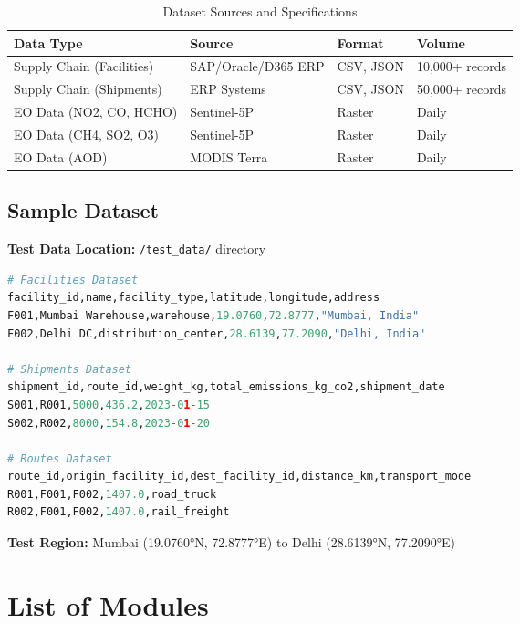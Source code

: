 \documentclass[11pt,a4paper]{article}
\begin{document}
\begin{table}[H]
\centering
\begin{tabular}{|l|l|l|l|}
\hline
\textbf{Data Type} & \textbf{Source} & \textbf{Format} & \textbf{Volume} \\
\hline
Supply Chain (Facilities) & SAP/Oracle/D365 ERP & CSV, JSON & 10,000+ records \\
Supply Chain (Shipments) & ERP Systems & CSV, JSON & 50,000+ records \\
EO Data (NO2, CO, HCHO) & Sentinel-5P & Raster & Daily \\
EO Data (CH4, SO2, O3) & Sentinel-5P & Raster & Daily \\
EO Data (AOD) & MODIS Terra & Raster & Daily \\
\hline
\end{tabular}
\caption{Dataset Sources and Specifications}
\end{table}

\subsection{Sample Dataset}

\textbf{Test Data Location:} \texttt{/test\_data/} directory

\begin{lstlisting}[language=Python, caption=Sample Data Structure, basicstyle=\footnotesize]
# Facilities Dataset
facility_id,name,facility_type,latitude,longitude,address
F001,Mumbai Warehouse,warehouse,19.0760,72.8777,"Mumbai, India"
F002,Delhi DC,distribution_center,28.6139,77.2090,"Delhi, India"

# Shipments Dataset
shipment_id,route_id,weight_kg,total_emissions_kg_co2,shipment_date
S001,R001,5000,436.2,2023-01-15
S002,R002,8000,154.8,2023-01-20

# Routes Dataset
route_id,origin_facility_id,dest_facility_id,distance_km,transport_mode
R001,F001,F002,1407.0,road_truck
R002,F001,F002,1407.0,rail_freight
\end{lstlisting}

\textbf{Test Region:} Mumbai (19.0760°N, 72.8777°E) to Delhi (28.6139°N, 77.2090°E)

\section{List of Modules}
\end{document}
